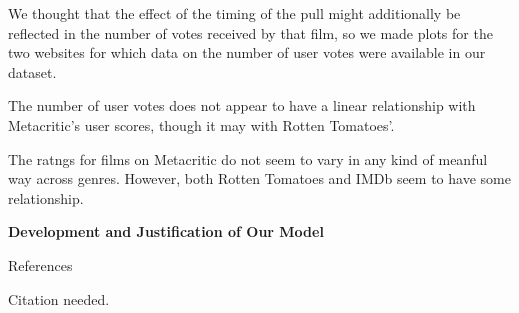 \documentclass[letter,12pt]{article}
\begin{document}
	We thought that the effect of the timing of the pull might additionally be reflected in the number of votes received by that film, so we made plots for the two websites for which data on the number of user votes were available in our dataset.
	\begin{center}
	\end{center}
	The number of user votes does not appear to have a linear relationship with Metacritic's user scores, though it may with Rotten Tomatoes'.
	\begin{center}
	\end{center}
	The ratngs for films on Metacritic do not seem to vary in any kind of meanful way across genres. However, both Rotten Tomatoes and IMDb seem to have some relationship.
	\begin{center}
	\end{center}
	\begin{center}
		\textbf{Development and Justification of Our Model}
	\end{center}
	\justify
	\lipsum[14-17]
	
	\newpage
	
	\begin{center}
		References
	\end{center}
	\raggedright
	\begin{hangparas}{.5in}{1}
		Citation needed.
	\end{hangparas}
\end{document}
